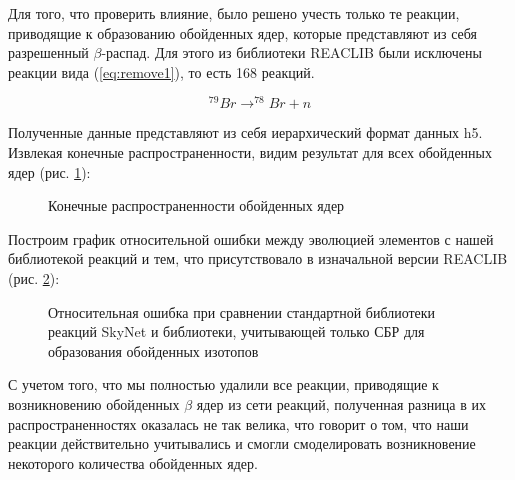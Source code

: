 \documentclass[%
master,    %
natbib,      %
subf,        %
href,        %
colorlinks,  %
]{disser}
\begin{document}
Для того, что проверить влияние, было решено учесть только те реакции, приводящие к образованию обойденных ядер, которые представляют из себя разрешенный $\beta$-распад. Для этого из библиотеки REACLIB были исключены реакции вида (\ref{eq:remove1}), то есть 168 реакций.

\begin{equation}
\label{eq:remove1}
	^{79}Br \to ^{78}Br + n
\end{equation}

Полученные данные представляют из себя иерархический формат данных h5. Извлекая конечные распространенности, видим результат для всех обойденных ядер (рис. \ref{ris:result}):

\begin{figure}[h]
	\caption{Конечные распространенности обойденных ядер}
	\label{ris:result}
\end{figure}

Построим график относительной ошибки между эволюцией элементов с нашей библиотекой реакций и тем, что присутствовало в изначальной версии REACLIB (рис. \ref{ris:result-err}):

\begin{figure}[h]
	\caption{Относительная ошибка при сравнении стандартной библиотеки реакций SkyNet и библиотеки, учитывающей только СБР для образования обойденных изотопов}
	\label{ris:result-err}
\end{figure}

С учетом того, что мы полностью удалили все реакции, приводящие к возникновению обойденных $\beta$ ядер из сети реакций, полученная разница в их распространенностях оказалась не так велика, что говорит о том, что наши реакции действительно учитывались и смогли смоделировать возникновение некоторого количества обойденных ядер.
\end{document}
